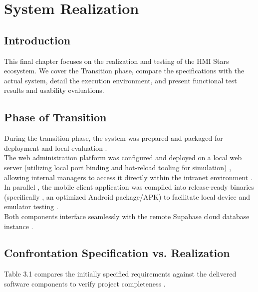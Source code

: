 \chapter{System Realization}

\section{Introduction}
This final chapter focuses on the realization and testing of the HMI Stars ecosystem. We cover the Transition phase, compare the specifications with the actual system, detail the execution environment, and present functional test results and usability evaluations.

\section{Phase of Transition}
During the transition phase, the system was prepared and packaged for deployment and local evaluation . \\The web administration platform was configured and deployed on a local web server (utilizing local port binding and hot-reload tooling for simulation) , allowing internal managers to access it directly within the intranet environment .\\ In parallel , the mobile client application was compiled into release-ready binaries (specifically , an optimized Android package/APK) to facilitate local device and\\ emulator testing .\\ Both components interface seamlessly with the remote Supabase cloud database\\ instance .


\section{Confrontation Specification vs. Realization}
Table 3.1 compares the initially specified requirements against the delivered software components to verify project completeness .

